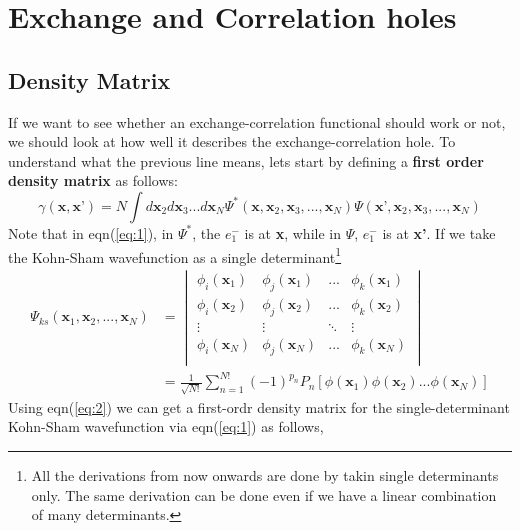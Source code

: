 \documentclass{article}
\begin{document}
 \section*{\LARGE{Exchange and Correlation holes}}
 \vspace{0.5cm}
 \subsection*{\Large{Density Matrix}}
 \begin{Large}
 \begin{flushleft}
 If we want to see whether an exchange-correlation functional should work or not, we should look at how well it describes the exchange-correlation hole. To understand what the previous line means, lets start by defining a \textbf{first order density matrix} as follows:
  \begin{equation}\label{eq:1}
  \gamma(\textbf{x},\textbf{x'}) = N \displaystyle{\int}d\textbf{x}_2d\textbf{x}_3...d\textbf{x}_N\Psi^*(\textbf{x},\textbf{x}_2,\textbf{x}_3,...,\textbf{x}_N)\Psi(\textbf{x'},\textbf{x}_2,\textbf{x}_3,...,\textbf{x}_N)
  \end{equation}
  Note that in eqn(\ref{eq:1}), in $\Psi^*$, the $e^-_1$ is at \textbf{x}, while in $\Psi$, $e^-_1$ is at \textbf{x'}. If we take the Kohn-Sham wavefunction as a single determinant\footnote{All the derivations from now onwards are done by takin single determinants only. The same derivation can be done even if we have a linear combination of many determinants.} 
  \begin{equation}\label{eq:2}
  \begin{split}
  \Psi_{ks}(\textbf{x}_1,\textbf{x}_2,...,\textbf{x}_N) &= 
  \begin{vmatrix}
  \phi_i(\textbf{x}_1) & \phi_j(\textbf{x}_1) & ... & \phi_k(\textbf{x}_1)\\
  \phi_i(\textbf{x}_2) & \phi_j(\textbf{x}_2) & ... & \phi_k(\textbf{x}_2)\\
  \vdots & \vdots & \ddots & \vdots\\
  \phi_i(\textbf{x}_N) & \phi_j(\textbf{x}_N) & ... & \phi_k(\textbf{x}_N)\\
  \end{vmatrix}\\
  &= \frac{1}{\sqrt{N!}}\sum_{n=1}^{N!}(-1)^{p_n}P_n[\phi(\textbf{x}_1)\phi(\textbf{x}_2)...\phi(\textbf{x}_N)] 
  \end{split}
  \end{equation}
  Using eqn(\ref{eq:2}) we can get a first-ordr density matrix for the single-determinant Kohn-Sham wavefunction via eqn(\ref{eq:1}) as follows,

\end{flushleft}
\end{Large}
\end{document}

